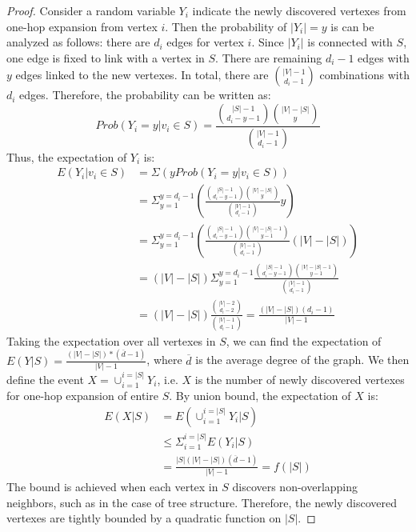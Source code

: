 \begin{proof}
Consider a random variable $Y_i$ indicate the newly 
discovered vertexes from one-hop expansion from vertex $i$. 
Then the probability of $|Y_i|=y$ is can be analyzed as follows: there 
are $d_i$ edges for vertex $i$. Since $|Y_i|$ is connected with $S$, one edge
is fixed to link with a vertex in $S$. There are remaining $d_i-1$ edges with
$y$ edges linked to the new vertexes. In total, there are $|V|-1 \choose d_i -1$
combinations with $d_i$ edges. Therefore, the probability can be written as:
\begin{equation}
Prob(Y_i = y| v_i \in S) = \frac{{|S| -1 \choose d_i - y -1}{|V|-|S| \choose y}}{{|V|-1 \choose d_i -1}}
\end{equation}
Thus, the expectation of $Y_i$ is:
\begin{equation}
\begin{split}
E(Y_i|v_i \in S) & = \Sigma( y Prob(Y_i = y| v_i \in S) )\\
	& = \Sigma_{y=1}^{y=d_i -1} ( \frac{{|S| -1 \choose d_i - y -1}{|V|-|S| \choose y}}{{|V|-1 \choose d_i -1}} y )\\
	& = \Sigma_{y=1}^{y=d_i -1} (\frac{{|S| -1 \choose d_i - y -1}{|V|-|S| -1 \choose y - 1}}{{|V|-1 \choose d_i -1}}  (|V|-|S|))\\
	& = (|V|-|S|)  \Sigma_{y=1}^{y=d_i -1}\frac{{|S| -1 \choose d_i - y -1}{|V|-|S| -1 \choose y - 1}}{{|V|-1 \choose d_i -1}} \\
	& = (|V|-|S|)  \frac{{|V|-2 \choose d_i - 2}}{{|V|-1 \choose d_i -1}} = \frac{(|V|-|S|)(d_i-1)}{|V| - 1}
\end{split}
\end{equation}
Taking the expectation over all vertexes in $S$, we can find the expectation of $E(Y|S) = \frac{(|V|-|S|)*(\overline{d}-1)}{|V| - 1}$, 
where $\overline{d}$ is the average degree of the graph. We then define the event $X=\cup_{i=1}^{i=|S|} Y_i$, i.e. $X$ is the number
of newly discovered vertexes for one-hop expansion of entire $S$. By union bound, 
the expectation of $X$ is:
\begin{equation} 
\begin{split}
E(X|S) &= E(\cup_{i=1}^{i=|S|}Y_i|S) \\
& \leq \Sigma_{i=1}^{i=|S|}E(Y_i|S) \\ 
&= \frac{|S|(|V|-|S|)(\overline{d} -1)}{|V|-1} = f(|S|)
\end{split}
\end{equation}
The bound is achieved when each vertex in $S$ discovers non-overlapping neighbors, such
as in the case of tree structure. Therefore, the newly discovered vertexes are tightly bounded 
by a quadratic function on $|S|$.
\end{proof}

